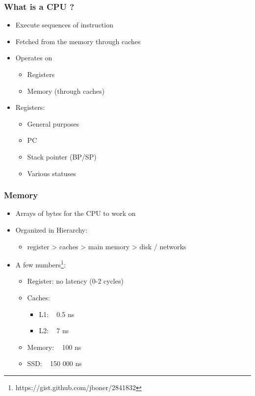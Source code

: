 \begin{frame}
  \frametitle{What is a CPU ?}

  \begin{itemize}
  \item Execute sequences of instruction
  \item Fetched from the memory through caches
  \item Operates on
    \begin{itemize}
    \item Registers
    \item Memory (through caches)
    \end{itemize}
  \item Registers:
    \begin{itemize}
    \item General purposes
    \item PC
    \item Stack pointer (BP/SP)
    \item Various statuses
    \end{itemize}
  \end{itemize}
\end{frame}



\begin{frame}
  \frametitle{Memory}

  \begin{itemize}
  \item Arrays of bytes for the CPU to work on
  \item Organized in Hierarchy:
    \begin{itemize}
    \item register > caches > main memory > disk / networks
    \end{itemize}
  \item A few numbers\footnote{https://gist.github.com/jboner/2841832}:
    \begin{itemize}
    \item Register: no latency (0-2 cycles)
    \item Caches:
      \begin{itemize}
      \item L1: ~ 0.5 ns
      \item L2: ~ 7 ns
      \end{itemize}
    \item Memory: ~ 100 ns
    \item SSD: ~ 150 000 ns
    \end{itemize}
  \end{itemize}
\end{frame}

